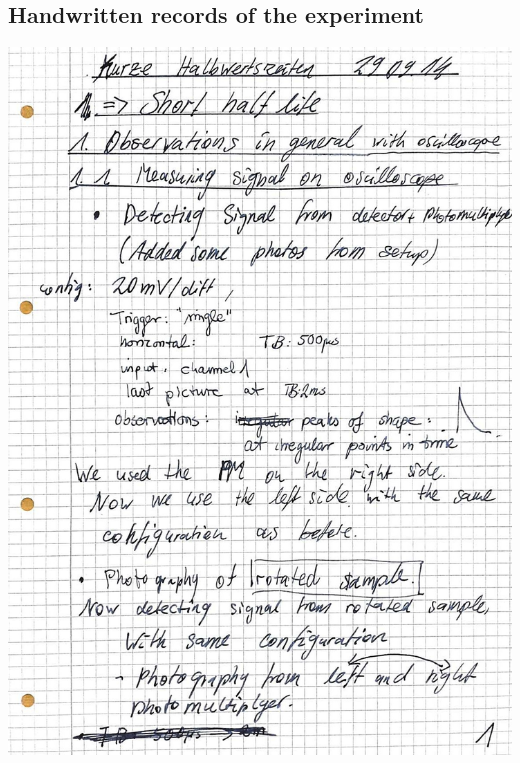 \subsection{Handwritten records of the experiment}
\label{sec:appendix_records}
    \includegraphics[width=\linewidth]{records/page1.jpeg}
